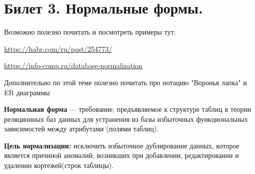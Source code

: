 \newpage
\section {Билет 3. Нормальные формы.}

Возможно полезно почитать и посмотреть примеры тут:

\url{https://habr.com/ru/post/254773/} 

\url{https://info-comp.ru/database-normalization}

Дополнительно по этой теме полезно почитать про нотацию "Воронья лапка" и ER диаграммы

\textbf{Нормальная форма} — требование, предъявляемое к структуре таблиц в теории реляционных баз данных для устранения из базы избыточных функциональных зависимостей между атрибутами (полями таблиц).

\textbf{Цель нормализации:} исключить избыточное дублирование данных, которое является причиной аномалий, возникших при добавлении, редактировании и удалении кортежей(строк таблицы).

